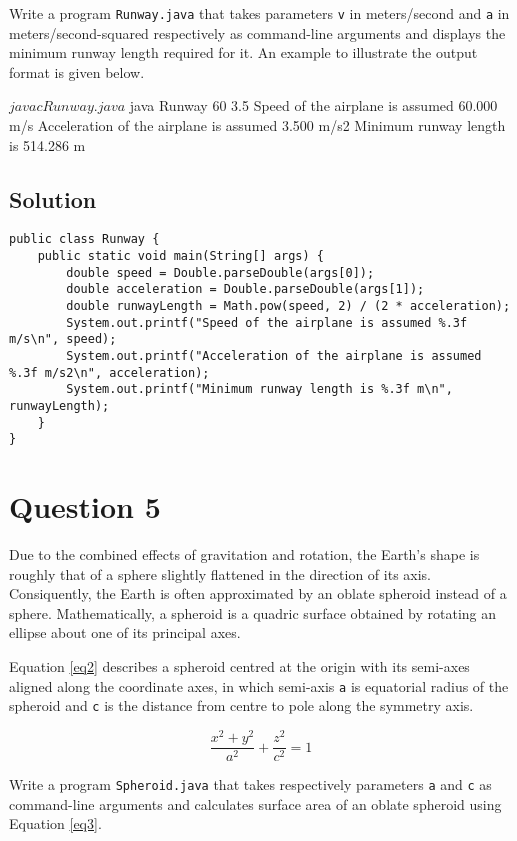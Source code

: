 Write a program \texttt{Runway.java} that takes parameters \texttt{v} in meters/second and \texttt{a} in meters/second-squared respectively as command-line arguments and displays the minimum runway length required for it. An example to illustrate the output format is given below.

\begin{terminal}
$ javac Runway.java
$ java Runway 60 3.5
Speed of the airplane is assumed 60.000 m/s
Acceleration of the airplane is assumed 3.500 m/s2
Minimum runway length is 514.286 m
\end{terminal}

\subsection*{Solution}
\lstset{language=Java,tabsize=2}
\begin{lstlisting}
public class Runway {
	public static void main(String[] args) {
		double speed = Double.parseDouble(args[0]);
		double acceleration = Double.parseDouble(args[1]);
		double runwayLength = Math.pow(speed, 2) / (2 * acceleration);
		System.out.printf("Speed of the airplane is assumed %.3f m/s\n", speed);
		System.out.printf("Acceleration of the airplane is assumed %.3f m/s2\n", acceleration);
		System.out.printf("Minimum runway length is %.3f m\n", runwayLength);
	}
}
\end{lstlisting}

\section*{Question 5}
Due to the combined effects of gravitation and rotation, the Earth's shape is roughly that of a sphere slightly flattened in the direction of its axis. Consiquently, the Earth is often approximated by an oblate spheroid instead of a sphere. Mathematically, a spheroid is a quadric surface obtained by rotating an ellipse about one of its principal axes.

Equation \ref{eq2} describes a spheroid centred at the origin with its semi-axes aligned along the coordinate axes, in which semi-axis \texttt{a} is equatorial radius of the spheroid and \texttt{c} is the distance from centre to pole along the symmetry axis.

\begin{equation}
\frac{x^2+y^2}{a^2} + \frac{z^2}{c^2} = 1
\label{eq2}
\end{equation}

Write a program \texttt{Spheroid.java} that takes respectively parameters \texttt{a} and \texttt{c} as command-line arguments and calculates surface area of an oblate spheroid using Equation \ref{eq3}.

